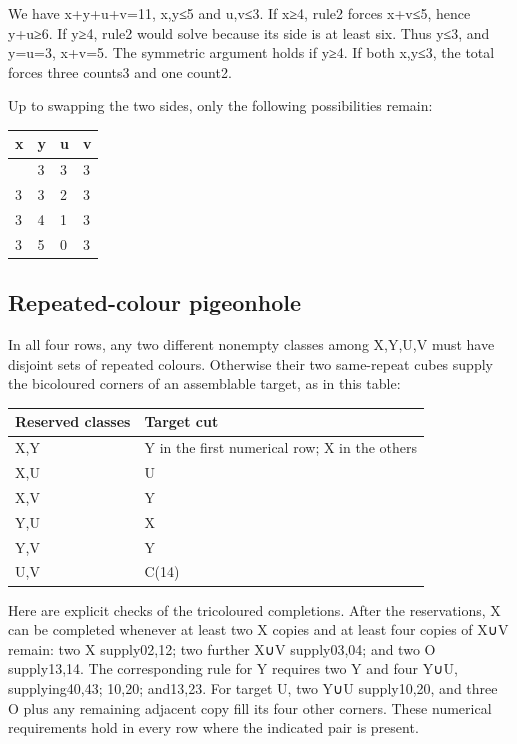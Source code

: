 \documentclass[
  10pt,
]{article}
\begin{document}
We have x+y+u+v=11, x,y≤5 and u,v≤3. If x≥4, rule2 forces x+v≤5, hence
y+u≥6. If y≥4, rule2 would solve because its side is at least six. Thus
y≤3, and y=u=3, x+v=5. The symmetric argument holds if y≥4. If both
x,y≤3, the total forces three counts3 and one count2.

Up to swapping the two sides, only the following possibilities remain:

\begin{longtable}[]{@{}llll@{}}
\toprule\noalign{}
x & y & u & v \\
\midrule\noalign{}
\endhead
\bottomrule\noalign{}
\endlastfoot
2 & 3 & 3 & 3 \\
3 & 3 & 2 & 3 \\
3 & 4 & 1 & 3 \\
3 & 5 & 0 & 3 \\
\end{longtable}

\hypertarget{repeated-colour-pigeonhole}{%
\subsection*{Repeated-colour
pigeonhole}\label{repeated-colour-pigeonhole}}

In all four rows, any two different nonempty classes among X,Y,U,V must
have disjoint sets of repeated colours. Otherwise their two same-repeat
cubes supply the bicoloured corners of an assemblable target, as in this
table:

\begin{longtable}[]{@{}ll@{}}
\toprule\noalign{}
Reserved classes & Target cut \\
\midrule\noalign{}
\endhead
\bottomrule\noalign{}
\endlastfoot
X,Y & Y in the first numerical row; X in the others \\
X,U & U \\
X,V & Y \\
Y,U & X \\
Y,V & Y \\
U,V & C(14) \\
\end{longtable}

Here are explicit checks of the tricoloured completions. After the
reservations, X can be completed whenever at least two X copies and at
least four copies of X∪V remain: two X supply02,12; two further X∪V
supply03,04; and two O supply13,14. The corresponding rule for Y
requires two Y and four Y∪U, supplying40,43; 10,20; and13,23. For target
U, two Y∪U supply10,20, and three O plus any remaining adjacent copy
fill its four other corners. These numerical requirements hold in every
row where the indicated pair is present.
\end{document}
